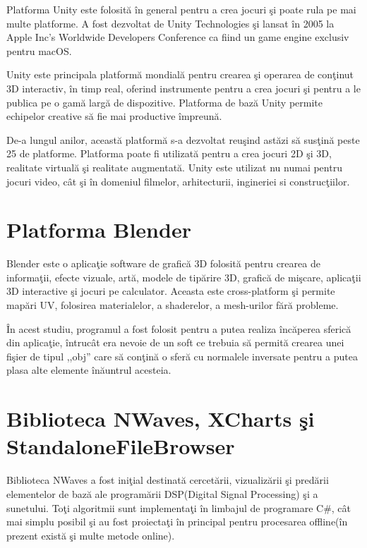 	Platforma Unity este folosit\u{a} \^{i}n general pentru a crea jocuri \c{s}i poate rula pe mai multe platforme. A fost dezvoltat de Unity Technologies \c{s}i lansat \^{i}n 2005 la Apple Inc's Worldwide Developers Conference ca fiind un game engine exclusiv pentru macOS. 
	\bigskip
	
	Unity este principala platform\u{a} mondial\u{a} pentru crearea \c{s}i operarea de con\c{t}inut 3D interactiv, \^{i}n timp real, oferind instrumente pentru a crea jocuri \c{s}i pentru a le publica pe o gam\u{a} larg\u{a} de dispozitive. Platforma de baz\u{a} Unity permite echipelor creative s\u{a} fie mai productive \^{i}mpreun\u{a}.
	\bigskip
	
	De-a lungul anilor, aceast\u{a} platform\u{a} s-a dezvoltat reu\c{s}ind ast\u{a}zi s\u{a} sus\c{t}in\u{a} peste 25 de platforme. Platforma poate fi utilizat\u{a} pentru a crea jocuri 2D \c{s}i 3D, realitate virtual\u{a} \c{s}i realitate augmentat\u{a}. Unity este utilizat nu numai pentru jocuri video, c\^{a}t \c{s}i \^{i}n domeniul filmelor, arhitecturii, ingineriei si construc\c{t}iilor\cite{unity}.
	
\section{Platforma Blender}
	
	Blender este o aplica\c{t}ie software de grafic\u{a} 3D folosit\u{a} pentru crearea de informa\c{t}ii, efecte vizuale, art\u{a}, modele de tip\u{a}rire 3D, grafic\u{a} de mi\c{s}care, aplica\c{t}ii 3D interactive \c{s}i jocuri pe calculator. Aceasta este cross-platform \c{s}i permite map\u{a}ri UV, folosirea materialelor, a shaderelor, a mesh-urilor f\u{a}r\u{a} probleme.
	\bigskip
	
	\^{I}n acest studiu, programul a fost folosit pentru a putea realiza \^{i}nc\u{a}perea sferic\u{a} din aplica\c{t}ie, \^{i}ntruc\^{a}t era nevoie de un soft ce trebuia s\u{a} permit\u{a} crearea unei fi\c{s}ier de tipul ,,obj'' care s\u{a} con\c{t}in\u{a} o sfer\u{a} cu normalele inversate pentru a putea plasa alte elemente \^{i}n\u{a}untrul acesteia.
	
\section{Biblioteca NWaves, XCharts \c{s}i StandaloneFileBrowser}

	Biblioteca NWaves a fost ini\c{t}ial destinat\u{a} cercet\u{a}rii, vizualiz\u{a}rii \c{s}i pred\u{a}rii elementelor de baz\u{a} ale program\u{a}rii DSP(Digital Signal Processing) \c{s}i a sunetului. To\c{t}i algoritmii sunt implementa\c{t}i \^{i}n limbajul de programare C{\#}, c\^{a}t mai simplu posibil \c{s}i au fost proiecta\c{t}i \^{i}n principal pentru procesarea offline(\^{i}n prezent exist\u{a} \c{s}i multe metode online)\cite{nwaves}.
	\bigskip
	
